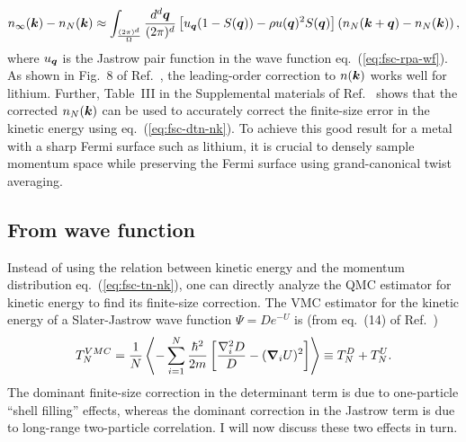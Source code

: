 \begin{align} \label{eq:fsc-dnk-lo}
n_{\infty}(\boldsymbol{k}) - n_N(\boldsymbol{k}) \approx \int_{\frac{(2\pi)^d}{\Omega}}
\dfrac{d^d\boldsymbol{q}}{(2\pi)^d}
\left[
u_{\boldsymbol{q}}(1-S(\boldsymbol{q}))-\rho u(\boldsymbol{q})^2S(\boldsymbol{q})
\right]
\left(
n_N(\boldsymbol{k}+\boldsymbol{q})-n_N(\boldsymbol{k})
\right),
\end{align}
where $u_{\boldsymbol{q}}$ is the Jastrow pair function in the wave function eq.~(\ref{eq:fsc-rpa-wf}).
As shown in Fig.~8 of Ref.~\cite{Yang2020-licp}, the leading-order correction to $n(\boldsymbol{k})$ works well for lithium. Further, Table~III in the Supplemental materials of Ref.~\cite{Yang2020-licp} shows that the corrected $n_N(\boldsymbol{k})$ can be used to accurately correct the finite-size error in the kinetic energy using eq.~(\ref{eq:fsc-dtn-nk}). To achieve this good result for a metal with a sharp Fermi surface such as lithium, it is crucial to densely sample momentum space while preserving the Fermi surface using grand-canonical twist averaging.

\subsection{From wave function}
Instead of using the relation between kinetic energy and the momentum distribution eq.~(\ref{eq:fsc-tn-nk}), one can directly analyze the QMC estimator for kinetic energy to find its finite-size correction. The VMC estimator for the kinetic energy of a Slater-Jastrow wave function $\Psi=De^{-U}$ is (from eq.~(14) of Ref.~\cite{Holzmann2016})
\begin{align} \label{eq:fsc-tn-vmc}
T_N^{VMC} = \frac{1}{N}\left\langle
-\sum\limits_{i=1}^N \dfrac{\hbar^2}{2m}\left[
\dfrac{\nabla_i^2D}{D} - (\boldsymbol{\nabla}_i U)^2
\right]
\right\rangle\equiv T_N^D + T_N^U.
\end{align}
The dominant finite-size correction in the determinant term is due to one-particle ``shell filling'' effects, whereas the dominant correction in the Jastrow term is due to long-range two-particle correlation. I will now discuss these two effects in turn.
